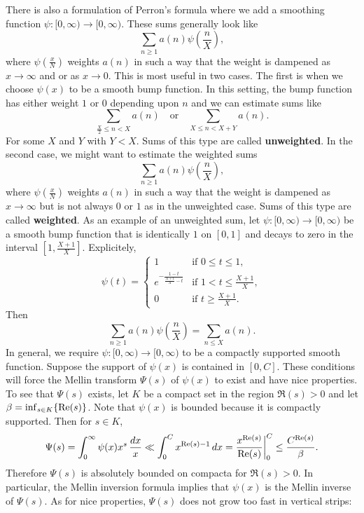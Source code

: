       There is also a formulation of Perron's formula where we add a smoothing function $\psi:[0,\infty) \to [0,\infty)$. These sums generally look like
      \[
        \sum_{n \ge 1}a(n)\psi\left(\frac{n}{X}\right),
      \]
      where $\psi\left(\frac{x}{N}\right)$ weights $a(n)$ in such a way that the weight is dampened as $x \to \infty$ and or as $x \to 0$. This is most useful in two cases. The first is when we choose $\psi(x)$ to be a smooth bump function. In this setting, the bump function has either weight $1$ or $0$ depending upon $n$ and we can estimate sums like
      \[
        \sum_{\frac{X}{2} \le n < X}a(n) \quad \text{or} \quad \sum_{X \le n < X+Y}a(n).
      \]
      For some $X$ and $Y$ with $Y < X$. Sums of this type are called \textbf{unweighted}. In the second case, we might want to estimate the weighted sums
      \[
        \sum_{n \ge 1}a(n)\psi\left(\frac{n}{X}\right),
      \]
      where $\psi\left(\frac{x}{N}\right)$ weights $a(n)$ in such a way that the weight is dampened as $x \to \infty$ but is not always $0$ or $1$ as in the unweighted case. Sums of this type are called \textbf{weighted}. As an example of an unweighted sum, let $\psi:[0,\infty) \to [0,\infty)$ be a smooth bump function that is identically $1$ on $[0,1]$ and decays to zero in the interval $\left[1,\frac{X+1}{X}\right]$. Explicitely,
      \[
          \psi(t) = \begin{cases} 1 & \text{if $0 \le t \le 1$}, \\ e^{-\frac{1-t}{\frac{X+1}{X}-t}} & \text{if $1 < t \le \frac{X+1}{X}$}, \\ 0 & \text{if $t \ge \frac{X+1}{X}$}. \end{cases}
      \]
      Then 
      \[
        \sum_{n \ge 1}a(n)\psi\left(\frac{n}{X}\right) = \sum_{n \le X}a(n).
      \]
      In general, we require $\psi:[0,\infty) \to [0,\infty)$ to be a compactly supported smooth function. Suppose the support of $\psi(x)$ is contained in $[0,C]$. These conditions will force the Mellin transform $\Psi(s)$ of $\psi(x)$ to exist and have nice properties. To see that $\Psi(s)$ exists, let $K$ be a compact set in the region $\Re(s) > 0$ and let $\beta = \inf_{s \in K}\{\mathrm{Re}(s)\}$. Note that $\psi(x)$ is bounded because it is compactly supported. Then for $s \in K$,
      \[
        \Psi(s) = \int_{0}^{\infty}\psi(x)x^{s}\,\frac{dx}{x} \ll \int_{0}^{C}x^{\mathrm{Re}(s)-1}\,dx = \frac{x^{\mathrm{Re}(s)}}{\mathrm{Re}(s)}\bigg|_{0}^{C} \le \frac{C^{\mathrm{Re}(s)}}{\beta}.
      \]
      Therefore $\Psi(s)$ is absolutely bounded on compacta for $\Re(s) > 0$. In particular, the Mellin inversion formula implies that $\psi(x)$ is the Mellin inverse of $\Psi(s)$. As for nice properties, $\Psi(s)$ does not grow too fast in vertical strips:

